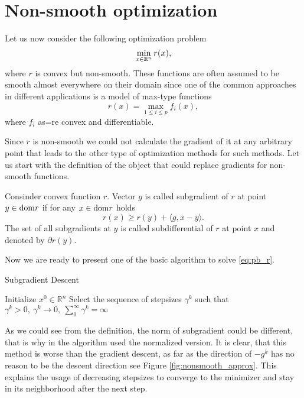 \section{Non-smooth optimization}\label{sec:basics_nonsmooth}
Let us now consider the following optimization problem
\begin{equation}\label{eq:pb_r}
\min_{x\in\mathbb{R}^n} r(x),
\end{equation}
where $r$ is convex but non-smooth. {\color{blue}These functions are often assumed to be smooth almost everywhere on their domain since one of the common approaches in different applications is a model of max-type functions
$$
r(x) = \max_{1\leq i \leq p} f_i(x),
$$
where $f_i$ as=re convex and differentiable.
}

Since $r$ is non-smooth we could not calculate the gradient of it at any arbitrary point that leads to the other type of optimization methods for such methods. {\color{blue}Let us start with the definition of the object that could replace gradients for non-smooth functions.}

\begin{definition}[Subgradient]
Consinder convex function $r$. Vector $g$ is called subgradient of $r$ at point $y\in\mathrm{dom} r$ if for any $x\in\mathrm{dom} r$ holds
\begin{equation}\label{eq:subgrad}
r(x)\geq r(y) + \langle g, x-y\rangle.
\end{equation}
The set of all subgradients at $y$ is called subdifferential of $r$ at point $x$ and denoted by $\partial r(y)$.
\end{definition}

Now we are ready to present one of the basic algorithm \cite[Chapter $3$]{nesterov-book} to solve \eqref{eq:pb_r}.

\begin{algorithm}
    \caption{Subgradient Descent}
    \label{algo:sd}
    \begin{algorithmic}
        \STATE Initialize $x^0\in\mathbb{R}^n$
        \STATE Select the sequence of stepsizes $\gamma^k$ such that
        $
            \gamma^k>0,~\gamma^k\rightarrow 0,~\sum_0^\infty \gamma^k = \infty
        $
        \ENDFOR
    \end{algorithmic}
\end{algorithm}

As we could see from the definition, the norm of subgradient could be different, that is why in the algorithm used the normalized version. It is clear, that this method is worse than the gradient descent, as far as the direction of $-g^k$ has no reason to be the descent direction see Figure \ref{fig:nonsmooth_approx}. This explains the usage of decreasing stepsizes to converge to the minimizer and stay in its neighborhood after the next step.


